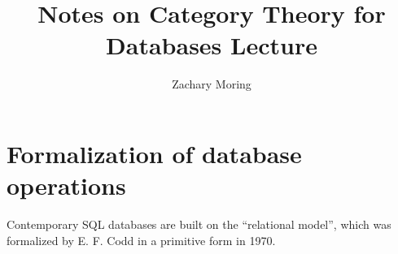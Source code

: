 \documentclass[11pt]{amsart}
\title{Notes on Category Theory for Databases Lecture}
\author{Zachary Moring}
\begin{document}
 \maketitle{}
    
    \section{Formalization of database operations}
    
    Contemporary SQL databases are built on the ``relational model'', which was formalized by E. F. Codd in a primitive form in 1970. \cite{codd1970} \cite{fong2019invitation}
    
\end{document}
